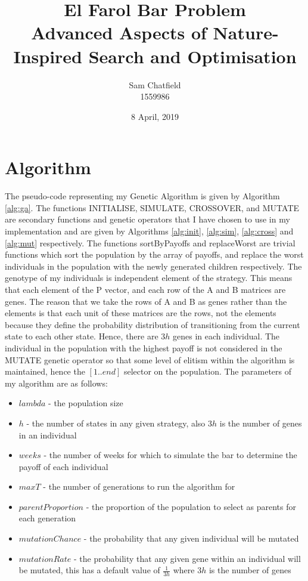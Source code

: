 \documentclass[11pt]{article}
\title{
  El Farol Bar Problem\\
  \large Advanced Aspects of Nature-Inspired Search and Optimisation
}
\author{
  Sam Chatfield\\
  1559986
}
\date{8 April, 2019}
\begin{document}
\maketitle

\section{Algorithm}

The pseudo-code representing my Genetic Algorithm is given by Algorithm \ref{alg:ga}.
The functions INITIALISE, SIMULATE, CROSSOVER, and MUTATE are secondary functions and genetic operators that I have chosen to use in my implementation and are given by Algorithms \ref{alg:init}, \ref{alg:sim}, \ref{alg:cross} and \ref{alg:mut} respectively.
The functions sortByPayoffs and replaceWorst are trivial functions which sort the population by the array of payoffs, and replace the worst individuals in the population with the newly generated children respectively.
The genotype of my individuals is independent element of the strategy.
This means that each element of the P vector, and each row of the A and B matrices are genes.
The reason that we take the rows of A and B as genes rather than the elements is that each unit of these matrices are the rows, not the elements because they define the probability distribution of transitioning from the current state to each other state.
Hence, there are $3h$ genes in each individual.
The individual in the population with the highest payoff is not considered in the MUTATE genetic operator so that some level of elitism within the algorithm is maintained, hence the $[1..end]$ selector on the population.
The parameters of my algorithm are as follows:
\begin{itemize}
  \item $lambda$ - the population size
  \item $h$ - the number of states in any given strategy, also $3h$ is the number of genes in an individual
  \item $weeks$ - the number of weeks for which to simulate the bar to determine the payoff of each individual
  \item $maxT$ - the number of generations to run the algorithm for
  \item $parentProportion$ - the proportion of the population to select as parents for each generation
  \item $mutationChance$ - the probability that any given individual will be mutated
  \item $mutationRate$ - the probability that any given gene within an individual will be mutated, this has a default value of $\frac{1}{3h}$ where $3h$ is the number of genes
\end{itemize}
\end{document}

